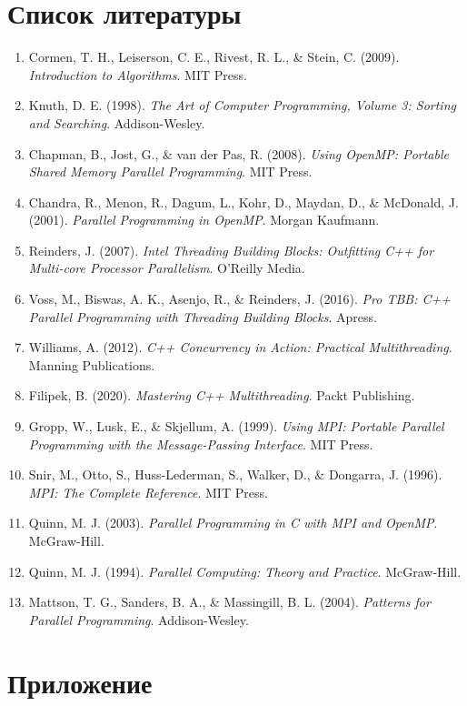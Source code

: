 \documentclass[12pt]{article}
\begin{document}
\section{Список литературы}
\begin{enumerate}
    \item Cormen, T. H., Leiserson, C. E., Rivest, R. L., \& Stein, C. (2009). \textit{Introduction to Algorithms}. MIT Press.  
    \item Knuth, D. E. (1998). \textit{The Art of Computer Programming, Volume 3: Sorting and Searching}. Addison-Wesley.  
    \item Chapman, B., Jost, G., \& van der Pas, R. (2008). \textit{Using OpenMP: Portable Shared Memory Parallel Programming}. MIT Press.  
    \item Chandra, R., Menon, R., Dagum, L., Kohr, D., Maydan, D., \& McDonald, J. (2001). \textit{Parallel Programming in OpenMP}. Morgan Kaufmann.  
    \item Reinders, J. (2007). \textit{Intel Threading Building Blocks: Outfitting C++ for Multi-core Processor Parallelism}. O'Reilly Media.  
    \item Voss, M., Biswas, A. K., Asenjo, R., \& Reinders, J. (2016). \textit{Pro TBB: C++ Parallel Programming with Threading Building Blocks}. Apress.  
    \item Williams, A. (2012). \textit{C++ Concurrency in Action: Practical Multithreading}. Manning Publications.  
    \item Filipek, B. (2020). \textit{Mastering C++ Multithreading}. Packt Publishing.  
    \item Gropp, W., Lusk, E., \& Skjellum, A. (1999). \textit{Using MPI: Portable Parallel Programming with the Message-Passing Interface}. MIT Press.  
    \item Snir, M., Otto, S., Huss-Lederman, S., Walker, D., \& Dongarra, J. (1996). \textit{MPI: The Complete Reference}. MIT Press.  
    \item Quinn, M. J. (2003). \textit{Parallel Programming in C with MPI and OpenMP}. McGraw-Hill.  
    \item Quinn, M. J. (1994). \textit{Parallel Computing: Theory and Practice}. McGraw-Hill.  
    \item Mattson, T. G., Sanders, B. A., \& Massingill, B. L. (2004). \textit{Patterns for Parallel Programming}. Addison-Wesley.  
\end{enumerate}
\appendix
\section*{Приложение}
\end{document}
